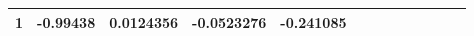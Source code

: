 \documentclass[letterpaper,11pt]{article}
\theoremstyle{definition}
\begin{document}
\begin{spacing}{1.5}
\begin{table}
\begin{tabular}{lllllllllllll}
         1 &        -0.99438 &       0.0124356 &       -0.0523276 &        -0.241085 \\
					\bottomrule
					\end{tabular}
				\end{table}


\end{spacing}
\end{document}
